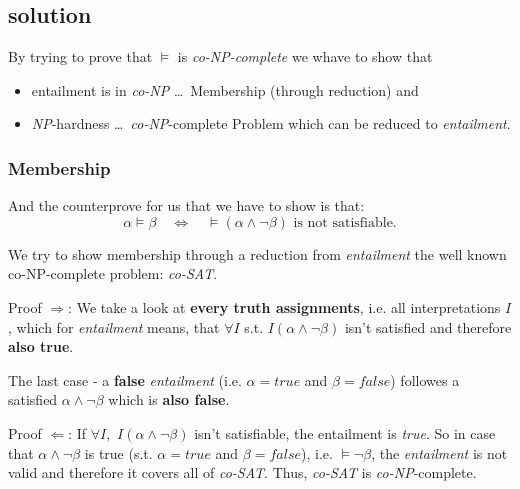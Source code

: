 \subsection{solution}

By trying to prove that $\models $ is \textit{co-NP-complete} we whave to
show that

\begin{itemize}
\item entailment is in \textit{co-NP} \dots\ Membership (through reduction)
and

\item \textit{NP}-hardness \dots\ \textit{co-NP}-complete Problem which can be
reduced to \textit{entailment}.
\end{itemize}

\subsubsection{Membership}

And the counterprove for us that we have to show is that:%
\begin{equation*}
\alpha \models \beta \quad \iff \quad \models (\alpha \wedge \lnot \beta )%
\text{ is not satisfiable.}
\end{equation*}

\noindent We try to show membership through a reduction from \textit{%
entailment} the well known co-NP-complete problem: \textit{co-SAT}.\newline

\noindent Proof $\Rightarrow $:\newline
We take a look at \textbf{every truth assignments}, i.e. all interpretations 
$I$, which for \textit{entailment} means, that $\forall I$ s.t. $I(\alpha
\wedge \lnot \beta )$ isn't satisfied and therefore \textbf{also true}.

The last case - a \textbf{false} \textit{entailment} (i.e. $\alpha =true$
and $\beta =false$) followes a satisfied $\alpha \wedge \lnot \beta $ which
is \textbf{also false}.

\noindent Proof $\Leftarrow $:\newline
If $\forall I,$ $I(\alpha \wedge \lnot \beta )$ isn't satisfiable, the
entailment is \textit{true}.\newline
So in case that $\alpha \wedge \lnot \beta $ is true (s.t. $\alpha =true$
and $\beta =false$), i.e. $\models \lnot \beta $, the \textit{entailment} is
not valid and therefore it covers all of \textit{co-SAT}. Thus, \textit{%
co-SAT} is \textit{co-NP}-complete. 

